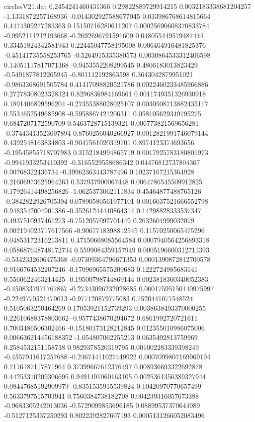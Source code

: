 \begin{filecontents}{circlesV21.dat}
0.2454241460431366	0.29822889729914215	0.0032183338681204257
-1.1331872257168936	-0.014302927588677045	0.033986768614815664
0.4474309277283363	0.15150716280611207	0.00025690608370833784
-0.9952111212193668	-0.2692696791591609	0.048055449579487444
0.33451824342581943	0.22445047758195008	0.006464916481825376
-0.45141735558253765	-0.5264915335380573	0.0030864533312406598
0.14051117817071368	-0.9453552208299545	0.4806183013823429
-0.5491877812265945	-0.801112192863598	0.3643042879951021
-0.9863368691505784	0.41417098820521786	0.0022460233485966886
0.27278308023328324	0.8296836984169661	0.0011749351326930918
0.1891406899596204	-0.27355388028025107	0.0030508713882435117
0.5534652549685908	-0.5958867421206311	0.058105629349795275
0.6847207172590709	0.5463728715139321	0.006773821569656281
-0.37443413523697894	0.8760256040266927	0.0012821991746079144
0.4392548163834803	-0.9047561020319701	0.8974123374693656
-0.19545855718707983	0.3152184994865719	0.0017925783180801973
-0.9941933253410392	-0.3165529558686342	0.04476812737804367
0.90768322436734	-0.39962363443787496	0.10237167215364928
0.21606973625964263	0.537937900067448	0.0064786545509912825
0.17926414498256826	-1.0625373062111834	0.45464877488765126
-0.3842822926705394	0.07890580561977101	0.0016037521666552798
0.9483542004901386	-0.35261244440864314	0.14298828333537347
0.4937510937461273	-0.7512057092701449	0.2632604999032079
0.002194023717617566	-0.9067718398812545	0.11570250065475296
0.04853172316213811	0.47150668085564584	0.0007940564256893318
0.058687648748172734	0.5599084359157949	0.0005196600312711393
-0.5342332606475368	-0.07309364796671353	0.0001390872812700578
0.9166764532207246	-0.17096965575209683	0.1222724985683141
0.5560622463214425	-0.19500798744869144	0.0023818360340052383
-0.4508337971767867	-0.27343096232028685	0.00017595150140975997
-0.2249770521470013	-0.977120879775083	0.7520441077548524
0.5105063250464269	0.17053921152739293	0.0038638493370000255
0.22610688378803662	-0.9577438670294672	0.6861992720721611
0.7003486506302466	-0.15180173128212845	0.012355010986075006
0.006636214456188352	-1.054807062255213	0.0635492813759969
0.2584532151158738	0.9829378520319795	0.001002283339398249
-0.4557941617257688	-0.24674411027449922	0.0007099807169969194
0.7116187117871964	0.37399667612376497	0.008936693322692878
0.44253310209306695	0.9491491060163105	0.0025361356389327944
0.08447685192909979	-0.8351535915539824	0.10420970770657499
0.5633797515703941	0.7560384738182708	0.004239316057673388
-0.9683305242013036	-0.5729099853696185	0.08899537370644989
-0.5127125337250293	0.8022392827607193	0.0005131266052083496

\end{filecontents}

